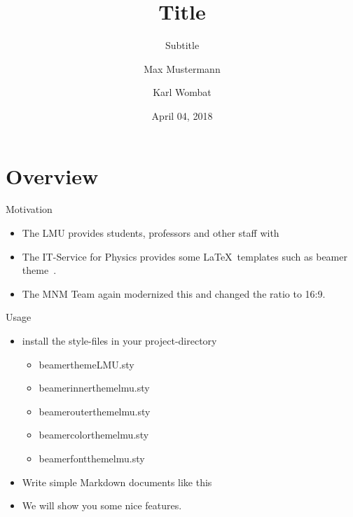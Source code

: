 \documentclass[
  fleqn,compress,utf8,aspectratio=169,t,
]{beamer}
\title{Title}
\subtitle{Subtitle}
\author{%
    Max Mustermann \and
    Karl Wombat}
\date{April 04, 2018}
\institute{MNM-Team, LMU München}
\providecommand{\tightlist}{%
  \setlength{\itemsep}{0pt}\setlength{\parskip}{0pt}}
\begin{document}
\begin{frame}
  \titlepage
\end{frame}

\hypertarget{overview}{%
\section{Overview}\label{overview}}

\begin{frame}{Motivation}
\protect\hypertarget{motivation}{}
\begin{itemize}
\tightlist
\item
  The LMU provides students, professors and other staff with

\item
  The IT-Service for Physics provides some \LaTeX~templates such as
  beamer theme~\autocite{lmu2014}.
\item
  The MNM Team again modernized this and changed the ratio to 16:9.
\end{itemize}
\end{frame}

\begin{frame}{Usage}
\protect\hypertarget{usage}{}
\begin{itemize}
\item
  install the style-files in your project-directory

  \begin{itemize}
  \tightlist
  \item
    beamerthemeLMU.sty
  \item
    beamerinnerthemelmu.sty
  \item
    beamerouterthemelmu.sty
  \item
    beamercolorthemelmu.sty
  \item
    beamerfontthemelmu.sty
  \end{itemize}
\item
  Write simple Markdown documents like this
\item
  We will show you some nice features.
\end{itemize}
\end{frame}
\end{document}

